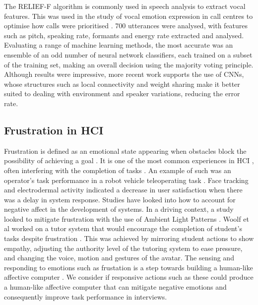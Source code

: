 \documentclass[12pt,a4paper]{article}
\begin{document}
The RELIEF-F algorithm \cite{kononenko1994estimating} is commonly used in speech analysis to extract vocal features. This was used in the study of vocal emotion expression in call centres to optimise how calls were prioritised \cite{petrushin1999emotion}. 700 utterances were analysed, with features such as pitch, speaking rate, formants and energy rate extracted and analysed. Evaluating a range of machine learning methods, the most accurate was an ensemble of an odd number of neural network classifiers, each trained on a subset of the training set, making an overall decision using the majority voting principle. Although results were impressive, more recent work supports the use of CNNs, whose structures such as local connectivity and weight sharing make it better suited to dealing with environment and speaker variations, reducing the error rate.
\subsection{Frustration in HCI}
Frustration is defined as an emotional state appearing when obstacles block the possibility of achieving a goal \cite{lawson1965frustration}. It is one of the most common experiences in HCI \cite{ceaparu2004determining}, often interfering with the completion of tasks \cite{waterhouse1953frustration}. An example of such was an operator's task performance in a robot vehicle teleoperating task \cite{yang2015effect}. Face tracking and electrodermal activity indicated a decrease in user satisfaction when there was a delay in system response. Studies have looked into how to account for negative affect in the development of systems. In a driving context, a study looked to mitigate frustration with the use of Ambient Light Patterns \cite{locken2017towards}. Woolf et al worked on a tutor system that would encourage the completion of student's tasks despite frustration \cite{woolf2009affect}. This was achieved by mirroring student actions to show empathy, adjusting the authority level of the tutoring system to ease pressure, and changing the voice, motion and gestures of the avatar. The sensing and responding to emotions such as frustation is a step towards building a human-like affective computer \cite{klein2002computer}. We consider if responsive actions such as these could produce a human-like affective computer that can mitigate negative emotions and consequently improve task performance in interviews. 
\end{document}
